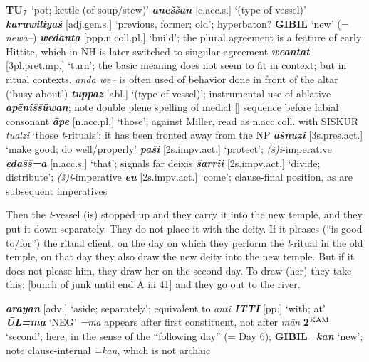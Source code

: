 \documentclass[10pt]{article}
\newcommand{\supersc}[1]{$^{\textrm{\scriptsize{#1}}}$}  	%
\newcommand{\subsc}[1]{$_{\textrm{\scriptsize{#1}}}$}	%
\newcommand{\bit}[1]{\textbf{\textit{#1}}}				%
\newcommand{\p}[1]{{\tiny[{#1}]}}					%
\newcommand{\hith}{\textsubwedge{h}}
\renewcommand{\.}[1]{\textsubdot{#1}}
\begin{document}
\begin{description}
\begin{notes}

\textbf{TU\subsc{7}} `pot; kettle (of soup/stew)' \bit{{\hith}ane\v{s}\v{s}an} \p{c.acc.s.} `(type of vessel)' \bit{karuwiliya\v{s}} \p{adj.gen.s.} `previous, former; old'; hyperbaton? \textbf{GIBIL} `new' (= \textit{newa--}) \bit{wedanta} \p{ppp.n.coll.pl.} `build'; the plural agreement is a feature of early Hittite, which in NH is later switched to singular agreement \bit{we{\hith}antat} \p{3pl.pret.mp.} `turn'; the basic meaning does not seem to fit in context; but in ritual contexts, \textit{anda we{\hith}--} is often used of behavior done in front of the altar (`busy about') \bit{tuppaz} \p{abl.} `(type of vessel)'; instrumental use of ablative \bit{ap\=eni\v{s}\v{s}\=uwan}; note double plene spelling of medial [] sequence before labial consonant \bit{\=ape} \p{n.acc.pl.} `those'; against Miller, read as n.acc.coll. with SISKUR \textit{tu{\hith}alzi} `those \textit{t}-rituals'; it has been fronted away from the NP \bit{a\v{s}nuzi} \p{3s.pres.act.} `make good; do well/properly' \bit{pa{\hith}\v{s}i} \p{2s.impv.act.} `protect'; \textit{(\v{s})i}-imperative \bit{eda\v{s}\v{s}=a} \p{n.acc.s.} `that'; signals far deixis \bit{\v{s}arrii} \p{2s.impv.act.} `divide; distribute'; \textit{(\v{s})i}-imperative \bit{e{\hith}u} \p{2s.impv.act.} `come'; clause-final position, as are subsequent imperatives


\end{notes}

\item[\S\S23--24 :] Then the \textit{t}-vessel (is) stopped up and they carry it into the new temple, and they put it down separately. They do not place it with the deity. If it pleases (``is good to/for'') the ritual client, on the day on which they perform the \textit{t}-ritual in the old temple, on that day they also draw the new deity into the new temple. But if it does not please him, they draw her on the second day. To draw (her) they take this: [bunch of junk until end A iii 41] and they go out to the river.

\begin{notes}

\bit{ar{\hith}ayan} \p{adv.} `aside; separately'; equivalent to \textit{{\hith}anti} \bit{ITTI} \p{pp.} `with; at' \bit{\=UL=ma} `NEG' \textit{=ma} appears after first constituent, not after \textit{m\=an} \textbf{2\supersc{KAM}} `second'; here, in the sense of the ``following day'' (= Day 6); \textbf{GIBIL}\bit{=kan} `new'; note clause-internal \textit{=kan}, which is not archaic


\end{notes}
\end{description}
\end{document}
